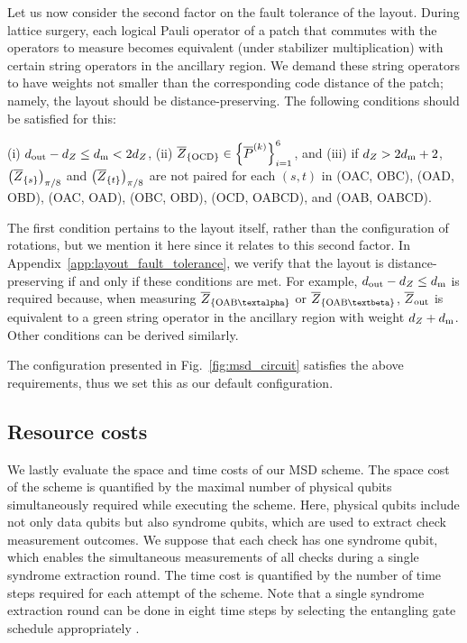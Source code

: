 \documentclass[
 prx,
 reprint,
 superscriptaddress,
 longbibliography,
 dvipsnames
]{revtex4-2}
\begin{document}
Let us now consider the second factor on the fault tolerance of the layout.
During lattice surgery, each logical Pauli operator of a patch that commutes with the operators to measure becomes equivalent (under stabilizer multiplication) with certain string operators in the ancillary region.
We demand these string operators to have weights not smaller than the corresponding code distance of the patch; namely, the layout should be distance-preserving.
The following conditions should be satisfied for this:
\begin{condition}
    (i) $d_{\mathrm{out}} - {d_Z} \leq d_{\mathrm{m}} < 2{d_Z}$, (ii) $\overline{Z}_\qty{\text{OCD}} \in \qty{\overline{P}^{(k)}}_{i=1}^6$, and (iii) if ${d_Z} > 2d_{\mathrm{m}} + 2$, $\qty(\overline{Z}_\qty{s})_{\pi/8}$ and $\qty(\overline{Z}_\qty{t})_{\pi/8}$ are not paired for each $(s,t)$ in (OAC, OBC), (OAD, OBD), (OAC, OAD), (OBC, OBD), (OCD, OABCD), and (OAB, OABCD).
\label{cond:dist_rotation_grouping}
\end{condition}
\noindent The first condition pertains to the layout itself, rather than the configuration of rotations, but we mention it here since it relates to this second factor.
In Appendix~\ref{app:layout_fault_tolerance}, we verify that the layout is distance-preserving if and only if these conditions are met.
For example, $d_{\mathrm{out}} - {d_Z} \leq d_{\mathrm{m}}$ is required because, when measuring $\lgztp{OAB\talpha}$ or $\lgztp{OAB\tbeta}$, $\overline{Z}_{\mathrm{out}}$ is equivalent to a green string operator in the ancillary region with weight ${d_Z} + d_{\mathrm{m}}$.
Other conditions can be derived similarly.

The configuration presented in Fig.~\ref{fig:msd_circuit} satisfies the above requirements, thus we set this as our default configuration.

\subsection{Resource costs \label{subsec:msd_resource_cost}}

We lastly evaluate the space and time costs of our MSD scheme.
The space cost of the scheme is quantified by the maximal number of physical qubits simultaneously required while executing the scheme.
Here, physical qubits include not only data qubits but also syndrome qubits, which are used to extract check measurement outcomes.
We suppose that each check has one syndrome qubit, which enables the simultaneous measurements of all checks during a single syndrome extraction round.
The time cost is quantified by the number of time steps required for each attempt of the scheme.
Note that a single syndrome extraction round can be done in eight time steps by selecting the entangling gate schedule appropriately \cite{beverland2021cost}.
\end{document}
